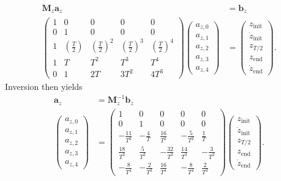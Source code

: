 \begin{align}
	\bm{M}_z\bm{a}_z &= \bm{b}_z \\
	\begin{pmatrix}
		1 & 0 & 0              & 0              & 0 \\
		0 & 1 & 0              & 0              & 0 \\
		1 & \left(\frac{T}{2}\right)        & \left(\frac{T}{2}\right)^2  & \left(\frac{T}{2}\right)^3 & \left(\frac{T}{2}\right)^4 \\
		1 & T & T^2            & T^3            & T^4 \\
		0 & 1 & 2T             & 3T^2           & 4T^3 
	\end{pmatrix}
	\begin{pmatrix}
		a_{z,0} \\
		a_{z,1} \\
		a_{z,2} \\
		a_{z,3} \\
		a_{z,4}
	\end{pmatrix} &=
	\begin{pmatrix}
		z_\text{init} \\
		\dot{z}_\text{init} \\
		z_{T/2} \\
		z_\text{end}\\
		\dot{z}_\text{end}
	\end{pmatrix}.
\end{align}
Inversion then yields
\begin{align}
	\bm{a}_z&=\bm{M}_z^{-1}\bm{b}_z \\
	\begin{pmatrix}
		a_{z,0} \\
		a_{z,1} \\
		a_{z,2} \\
		a_{z,3} \\
		a_{z,4}
	\end{pmatrix} &=
	\begin{pmatrix}
		1 & 0 & 0 & 0 & 0 \\
		0 & 1 & 0 & 0 & 0 \\
		-\frac{11}{T^2} & -\frac{4}{T} & \frac{16}{T^2} & -\frac{5}{T^2} & \frac{1}{T} \\
		\frac{18}{T^3} & \frac{5}{T^2} & -\frac{32}{T^3} & \frac{14}{T^3} & -\frac{3}{T^2} \\
		-\frac{8}{T^4} & -\frac{2}{T^3} & \frac{16}{T^4} & -\frac{8}{T^4} & \frac{2}{T^3}
	\end{pmatrix}
	\begin{pmatrix}
		z_\text{init} \\
		\dot{z}_\text{init} \\
		z_{T/2} \\
		z_\text{end}\\
		\dot{z}_\text{end}
	\end{pmatrix}.
	\label{eq::231_ai_4th}
\end{align}
